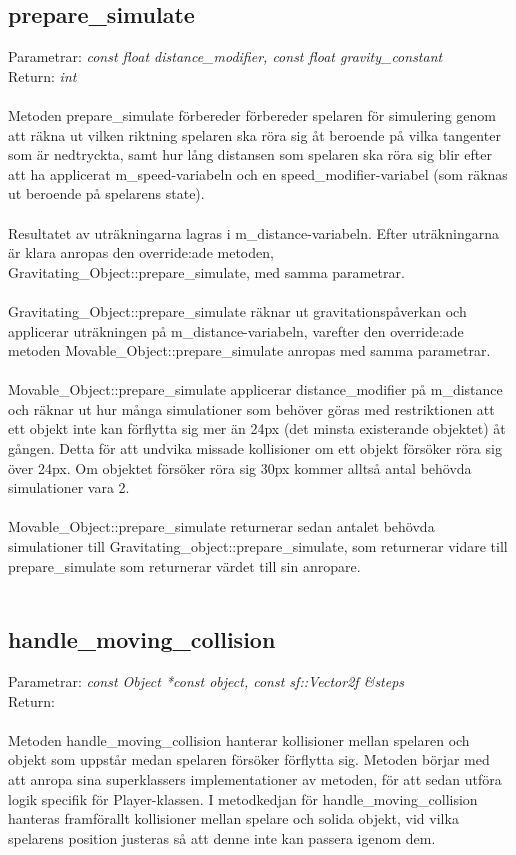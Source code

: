 \documentclass{TDP003mall}
\begin{document}
\subsection{prepare\_simulate}
Parametrar: \textit{const float distance\_modifier, const float gravity\_constant}
\\Return: \textit{int}
\\\\
Metoden prepare\_simulate förbereder förbereder spelaren för simulering genom att räkna ut vilken riktning spelaren ska röra sig åt beroende på vilka tangenter som är nedtryckta, samt hur lång distansen som spelaren ska röra sig blir efter att ha applicerat m\_speed-variabeln och en speed\_modifier-variabel (som räknas ut beroende på spelarens state).
\\\\
Resultatet av uträkningarna lagras i m\_distance-variabeln. Efter uträkningarna är klara anropas den override:ade metoden, Gravitating\_Object::prepare\_simulate, med samma parametrar.
\\\\
Gravitating\_Object::prepare\_simulate räknar ut gravitationspåverkan och applicerar uträkningen på m\_distance-variabeln, varefter den override:ade metoden Movable\_Object::prepare\_simulate anropas med samma parametrar.
\\\\
Movable\_Object::prepare\_simulate applicerar distance\_modifier på m\_distance och räknar ut hur många simulationer som behöver göras med restriktionen att ett objekt inte kan förflytta sig mer än 24px (det minsta existerande objektet) åt gången. Detta för att undvika missade kollisioner om ett objekt försöker röra sig över 24px. Om objektet försöker röra sig 30px kommer alltså antal behövda simulationer vara 2.
\\\\
Movable\_Object::prepare\_simulate returnerar sedan antalet behövda simulationer till Gravitating\_object::prepare\_simulate, som returnerar vidare till prepare\_simulate som returnerar värdet till sin anropare.
\\\\
\subsection{handle\_moving\_collision}
Parametrar: \textit{const Object *const object, const sf::Vector2f \&steps}
\\Return: \textit{}
\\\\
Metoden handle\_moving\_collision hanterar kollisioner mellan spelaren och objekt som uppstår medan spelaren försöker förflytta sig. Metoden börjar med att anropa sina superklassers implementationer av metoden, för att sedan utföra logik specifik för Player-klassen. I metodkedjan för handle\_moving\_collision hanteras framförallt kollisioner mellan spelare och solida objekt, vid vilka spelarens position justeras så att denne inte kan passera igenom dem.
\end{document}
